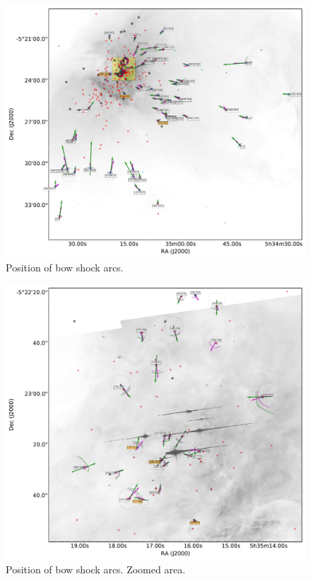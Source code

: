 \documentclass{emulateapj}
\begin{document}
\begin{figure}
  \includegraphics[width=\linewidth]{ll-pos-image}
  \caption{Position of bow shock arcs.}
  \label{fig:pos-image}
\end{figure}

\begin{figure}
  \includegraphics[width=\linewidth]{ll-pos-image-zoom}
  \caption{Position of bow shock arcs. Zoomed area.}
  \label{fig:pos-image}
\end{figure}
\end{document}
